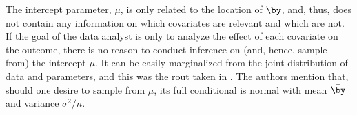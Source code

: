 \documentclass[a4paper, 10pt]{article}
\begin{document}
The intercept parameter, $ \mu $, is only related to the location of $ \by $, and, thus, does not contain any information on which covariates are relevant and which are not.
If the goal of the data analyst is only to analyze the effect of each covariate on the outcome, there is no reason to conduct inference on (and, hence, sample from) the intercept $ \mu $.
It can be easily marginalized from the joint distribution of data and parameters, and this was the rout taken in \cite{parkcasella2008bayesianlasso}.
The authors mention that, should one desire to sample from $ \mu $, its full conditional is normal with mean $ \bar{ \by } $ and variance $ \sigma^2/n $.


\end{document}
